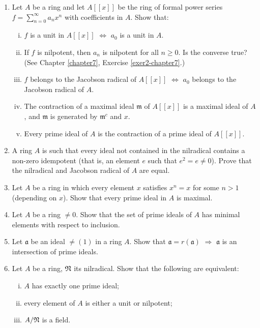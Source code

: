 \begin{enumerate}
    \item \label{exer5-chapter1}Let $A$ be a ring and let $A[[x]]$ be the ring of formal power series $f = \sum_{n=0}^\infty a_n x^n$ with coefficients in $A$. Show that:
    \begin{enumerate}[i)]
        \item $f$ is a unit in $A[[x]]$ $\iff$ $a_0$ is a unit in $A$.
        \item If $f$ is nilpotent, then $a_n$ is nilpotent for all $n \geq 0$. Is the converse true? (See Chapter \ref{chapter7}, Exercise \ref{exer2-chapter7}.)
        \item $f$ belongs to the Jacobson radical of $A[[x]]$ $\iff$ $a_0$ belongs to the Jacobson radical of $A$.
        \item The contraction of a maximal ideal $\mathfrak{m}$ of $A[[x]]$ is a maximal ideal of $A$, and $\mathfrak{m}$ is generated by $\mathfrak{m}^c$ and $x$.
        \item Every prime ideal of $A$ is the contraction of a prime ideal of $A[[x]]$.
    \end{enumerate}

    \item \label{exer6-chapter1}A ring $A$ is such that every ideal not contained in the nilradical contains a non-zero idempotent (that is, an element $e$ such that $e^2 = e \neq 0$). Prove that the nilradical and Jacobson radical of $A$ are equal.

    \item \label{exer7-chapter1}Let $A$ be a ring in which every element $x$ satisfies $x^n = x$ for some $n > 1$ (depending on $x$). Show that every prime ideal in $A$ is maximal.

    \item \label{exer8-chapter1}Let $A$ be a ring $\neq 0$. Show that the set of prime ideals of $A$ has minimal elements with respect to inclusion.

    \item \label{exer9-chapter1}Let $\mathfrak{a}$ be an ideal $\neq (1)$ in a ring $A$. Show that $\mathfrak{a} = r(\mathfrak{a})$ $\Rightarrow$ $\mathfrak{a}$ is an intersection of prime ideals.

    \item \label{exer10-chapter1}Let $A$ be a ring, $\mathfrak{N}$ its nilradical. Show that the following are equivalent:
    \begin{enumerate}[i)]
        \item $A$ has exactly one prime ideal;
        \item every element of $A$ is either a unit or nilpotent;
        \item $A/\mathfrak{N}$ is a field.
    \end{enumerate}


\end{enumerate}
